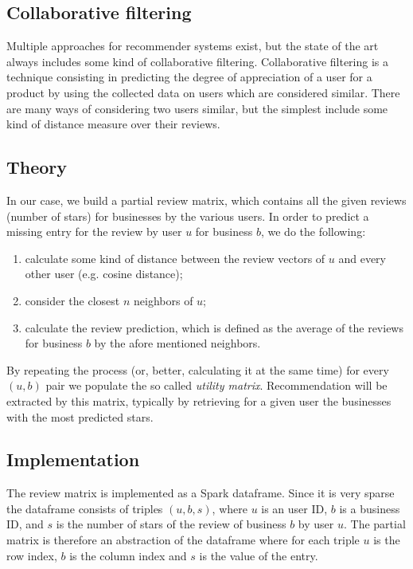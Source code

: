 \documentclass[11pt,a4paper]{article}
\begin{document}
\begin{multicols}{2}
\section{Collaborative filtering}\label{collabfiltering}
Multiple approaches for recommender systems exist, but the state of the art always includes some kind of collaborative filtering.
Collaborative filtering is a technique consisting in predicting the degree of appreciation of a user for a product by using the collected data on users which are considered similar.
There are many ways of considering two users similar, but the simplest include some kind of distance measure over their reviews.


\subsection{Theory}
In our case, we build a partial review matrix, which contains all the given reviews (number of stars) for businesses by the various users.
In order to predict a missing entry for the review by user $u$ for business $b$, we do the following:
\begin{enumerate}
	\item calculate some kind of distance between the review vectors of $u$ and every other user (e.g. cosine distance);
	\item consider the closest $n$ neighbors of $u$;
	\item calculate the review prediction, which is defined as the average of the reviews for business $b$ by the afore mentioned neighbors.
\end{enumerate}
By repeating the process (or, better, calculating it at the same time) for every $(u,b)$ pair we populate the so called \emph{utility matrix}.
Recommendation will be extracted by this matrix, typically by retrieving for a given user the businesses with the most predicted stars.


\subsection{Implementation}
The review matrix is implemented as a Spark dataframe.
Since it is very sparse the dataframe consists of triples $(u,b,s)$, where $u$ is an user ID, $b$ is a business ID, and $s$ is the number of stars of the review of business $b$ by user $u$.
The partial matrix is therefore an abstraction of the dataframe where for each triple $u$ is the row index, $b$ is the column index and $s$ is the value of the entry.


\end{multicols}
\end{document}
